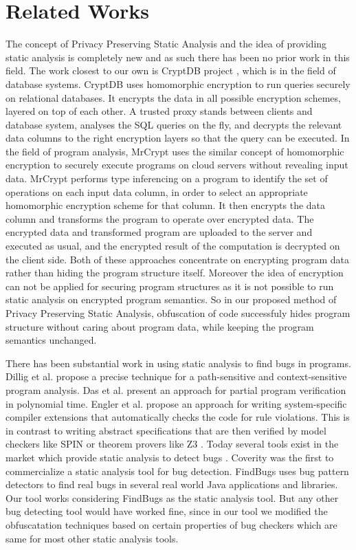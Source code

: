 \documentclass[conference]{IEEEtran}
\begin{document}
\section{Related Works}
The concept of Privacy Preserving Static Analysis and the idea of providing static analysis is completely new and as such there has been no prior work in this field. The work closest 
to our own is CryptDB project \cite{cryptdb}, which is in the field of database systems. CryptDB uses homomorphic encryption to run queries securely on relational databases. It encrypts 
the data in all possible encryption schemes, layered on top of each other. A trusted proxy stands between clients and database system, analyses the SQL queries on the fly, and decrypts 
the relevant data columns to the right encryption layers so that the query can be executed. In the field of program analysis, MrCrypt \cite{mrcrypt} uses the similar concept of homomorphic 
encryption to securely execute programs on cloud servers without revealing input data. MrCrypt performs type inferencing on a program to identify the set of operations on each input data 
column, in order to select an appropriate homomorphic encryption scheme for that column. It then encrypts the data column and transforms the program to operate over encrypted data. The 
encrypted data and transformed program are uploaded to the server and executed as usual, and the encrypted result of the computation is decrypted on the client side. Both of these 
approaches concentrate on encrypting program data rather than hiding the program structure itself. Moreover the idea of encryption can not be applied for securing program structures as 
it is not possible to run static analysis on encrypted program semantics. So in our proposed method of Privacy Preserving Static Analysis, obfuscation of code successfuly hides program 
structure without caring about program data, while keeping the program semantics unchanged.

There has been substantial work in using static analysis to find bugs in programs. Dillig et al. \cite{dillig} propose a precise technique for a path-sensitive and context-sensitive 
program analysis. Das et al. \cite{das} present an approach for partial program verification in polynomial time. Engler et al. \cite{engler} propose an approach for writing system-specific 
compiler extensions that automatically checks the code for rule violations. This is in contrast to writing abstract specifications that are then verified by model checkers like SPIN 
\cite{spin} or theorem provers like Z3 \cite{z3}. Today several tools exist in the market which provide static analysis to detect bugs \cite{coverity,klocwork,parasoft,findbugs,chess,saturn}. 
Coverity \cite{billionlinesofcode} was the first to commercialize a static analysis tool for bug detection. FindBugs \cite{findbugs} uses bug pattern detectors to find real bugs in 
several real world Java applications and libraries. Our tool works considering FindBugs as the static analysis tool. But any other bug detecting tool would have worked fine, since in 
our tool we modified the obfuscatation techniques based on certain properties of bug checkers which are same for most other static analysis tools.
\end{document}
